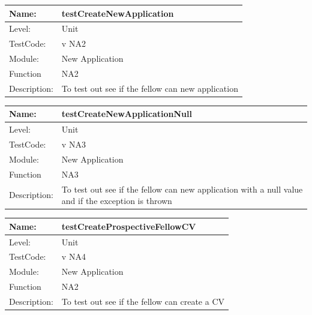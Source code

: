 \documentclass[12pt]{article}
\begin{document}
\begin{center}
\begin{tabular}{|l|p{12cm}|}
\hline

 Name: & testCreateNewApplication  \\
\hline
Level: & Unit \\
\hline
TestCode: & v NA2 \\
\hline
Module:& New Application\\
\hline
Function & NA2 \\
\hline
Description: & To test out see if the fellow can  new application  \\
\hline

\end{tabular}
\end{center}

\begin{center}
\begin{tabular}{|l|p{12cm}|}
\hline
 Name: & testCreateNewApplicationNull  \\
\hline
Level: & Unit \\
\hline
TestCode: & v NA3 \\
\hline
Module:& New Application\\
\hline
Function & NA3 \\
\hline
Description: & To test out see if the fellow can  new application with a null value and if the exception is thrown  \\
\hline

\end{tabular}
\end{center}

\begin{center}
\begin{tabular}{|l|p{12cm}|}
\hline

 Name: & testCreateProspectiveFellowCV  \\
\hline
Level: & Unit \\
\hline
TestCode: & v NA4 \\
\hline
Module:& New Application\\
\hline
Function & NA2 \\
\hline
Description: & To test out see if the fellow can  create a CV  \\
\hline

\end{tabular}
\end{center}
\end{document}
